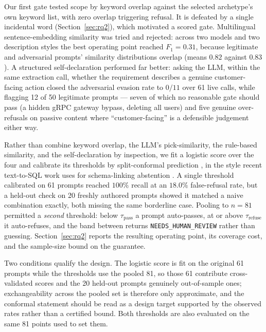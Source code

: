\documentclass[journal, 10pt]{IEEEtran}
\begin{document}
Our first gate tested scope by keyword overlap against the selected archetype's
own keyword list, with zero overlap triggering refusal. It is defeated by a
single incidental word (Section~\ref{sec:rq2}), which motivated a scored gate.
Multilingual sentence-embedding similarity was tried and rejected: across two
models \cite{wang2024multilinguale5} and two description styles the best
operating point reached $F_1 = 0.31$, because legitimate and adversarial prompts'
similarity distributions overlap (means $0.82$ against $0.83$). A structured
self-declaration performed far better: asking the LLM, within the same extraction
call, whether the requirement describes a genuine customer-facing action closed
the adversarial evasion rate to $0/11$ over 61 live calls, while flagging 12 of
50 legitimate prompts --- seven of which no reasonable gate should pass (a hidden
gRPC gateway bypass, deleting all users) and five genuine over-refusals on
passive content where ``customer-facing'' is a defensible judgement either way.

Rather than combine keyword overlap, the LLM's pick-similarity, the rule-based
similarity, and the self-declaration by inspection, we fit a logistic score over
the four and calibrate its thresholds by split-conformal prediction
\cite{angelopoulos2023conformal}, in the style recent text-to-SQL work uses for
schema-linking abstention \cite{chen2025rts}. A single threshold calibrated on 61
prompts reached $100\%$ recall at an $18.0\%$ false-refusal rate, but a held-out
check on 20 freshly authored prompts showed it matched a naive combination
exactly, both missing the same borderline case. Pooling to $n{=}81$ permitted a
\emph{second} threshold: below
$\tau_{\text{pass}}$ a prompt auto-passes, at or above $\tau_{\text{refuse}}$ it
auto-refuses, and the band between returns \texttt{NEEDS\_HUMAN\_REVIEW} rather
than guessing. Section~\ref{sec:rq2} reports the resulting operating point, its
coverage cost, and the sample-size bound on the guarantee.

Two conditions qualify the design. The logistic score is fit on the original 61
prompts while the thresholds use the pooled 81, so those 61 contribute
cross-validated scores and the 20 held-out prompts genuinely out-of-sample ones;
exchangeability across the pooled set is therefore only approximate, and the
conformal statement should be read as a design target supported by the observed
rates rather than a certified bound. Both thresholds are also evaluated on the
same 81 points used to set them.
\end{document}
